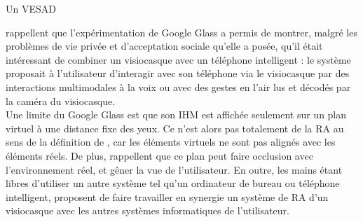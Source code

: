 Un VESAD 

\citet{KoelleKranzMoeller2015} rappellent que l'expérimentation de Google Glass a permis de montrer, malgré les problèmes de vie privée et d'acceptation sociale qu'elle a posée, qu'il était intéressant de combiner un visiocasque avec un téléphone intelligent : le système proposait à l'utilisateur d'interagir avec son téléphone via le visiocasque par des interactions multimodales à la voix ou avec des gestes en l'air lus et décodés par la caméra du visiocasque.\\
Une limite du Google Glass est que son IHM est affichée seulement sur un plan virtuel à une distance fixe des yeux. Ce n'est alors pas totalement de la RA au sens de la définition de \citet{AzumaBaillotBehringerEtAl2001}, car les éléments virtuels ne sont pas alignés avec les éléments réels. De plus, \citet{SerranoEnsYangEtAl2015} rappellent que ce plan peut faire occlusion avec l'environnement réel, et gêner la vue de l'utilisateur. En outre, les mains étant libres d'utiliser un autre système tel qu'un ordinateur de bureau ou téléphone intelligent, \citet{SerranoEnsYangEtAl2015b} proposent de faire travailler en synergie un système de RA d'un visiocasque avec les autres systèmes informatiques de l'utilisateur.

